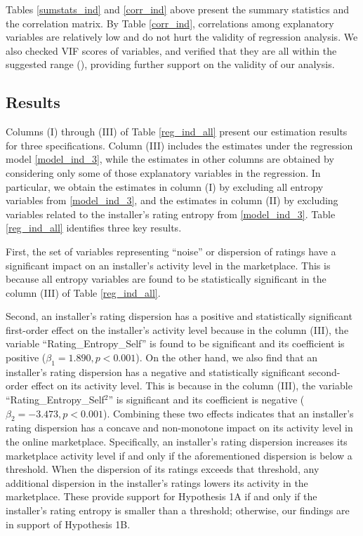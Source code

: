 \documentclass[msom,blindrev]{informs3}
\begin{document}
	
	
	
	
	Tables \ref{sumstats_ind} and \ref{corr_ind} above present the summary statistics and the correlation matrix. By Table \ref{corr_ind}, correlations among explanatory variables are relatively low and do not hurt the validity of regression analysis. We also checked VIF scores of variables, and verified that they are all within the suggested range (\cite{hairmultivariate}), providing further support on the validity of our analysis.
	

	
	\subsection{Results}
	
Columns (I) through (III) of Table \ref{reg_ind_all} present our estimation results for three specifications. Column (III) includes the estimates under the regression model \eqref{model_ind_3}, while the estimates in other columns are obtained by considering only some of those explanatory variables in the regression. In particular, we obtain the estimates in column (I) by excluding all entropy variables from \eqref{model_ind_3}, and the estimates in column (II) by excluding variables related to the installer's rating entropy from \eqref{model_ind_3}. Table \ref{reg_ind_all} identifies three key results.




First, the set of variables representing ``noise'' or dispersion of ratings have a significant impact on an installer's activity level in the marketplace. This is because  all entropy variables are found to be statistically significant in the column (III) of Table \ref{reg_ind_all}.
	
	Second, an installer's rating dispersion has a positive and statistically significant first-order effect on the installer's activity level because in the column (III), the variable ``Rating\_Entropy\_Self'' is found to be significant and its coefficient is positive ($\beta_{1} = 1.890,p<0.001$). On the other hand, we also find that an installer's rating dispersion has a negative and statistically significant second-order effect on its activity level. This is because in the column (III), the variable ``Rating\_Entropy\_Self$^2$'' is significant and its coefficient is negative ($\beta_{2} = -3.473, p<0.001$). Combining these two effects indicates that an installer's rating dispersion has a concave and non-monotone impact on its activity level in the online marketplace. Specifically,  an installer's rating dispersion increases its marketplace activity level if and only if the aforementioned dispersion is below a threshold. When the dispersion of its ratings exceeds that threshold, any additional dispersion in the installer's ratings lowers its activity in the marketplace. These provide support for Hypothesis 1A if and only if the installer's rating entropy is smaller than a threshold; otherwise, our findings are in support of Hypothesis 1B.
	
\end{document}
